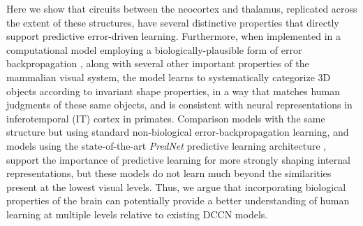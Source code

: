 \documentclass[11pt,twoside]{article}
\newif\myifpdf
\begin{document}
Here we show that circuits between the neocortex and thalamus, replicated across the extent of these structures, have several distinctive properties that directly support predictive error-driven learning. Furthermore, when implemented in a computational model employing a biologically-plausible form of error backpropagation \cite{OReilly96,OReillyMunakata00,OReillyMunakataFrankEtAl12}, along with several other important properties of the mammalian visual system, the model learns to systematically categorize 3D objects according to invariant shape properties, in a way that matches human judgments of these same objects, and is consistent with neural representations in inferotemporal (IT) cortex in primates.  Comparison models with the same structure but using standard non-biological error-backpropagation learning, and models using the state-of-the-art {\em PredNet} predictive learning architecture \cite{LotterKreimanCox16}, support the importance of predictive learning for more strongly shaping internal representations, but these models do not learn much beyond the similarities present at the lowest visual levels.  Thus, we argue that incorporating biological properties of the brain can potentially provide a better understanding of human learning at multiple levels relative to existing DCCN models.
\end{document}
